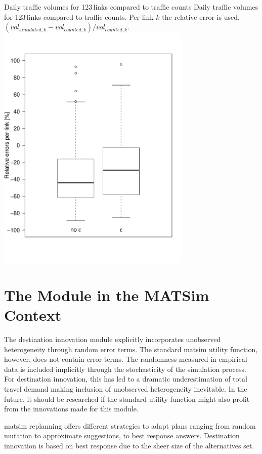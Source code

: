 \createfigure%
{Daily traffic volumes for 123\,links compared to traffic counts}%
{Daily traffic volumes for 123\,links compared to traffic counts. Per link $k$ the relative error is used, \ie $(vol_{simulated,k}-vol_{counted,k}) / vol_{counted,k}$.}%
{\label{fig:countsLEGO}}%
{\includegraphics[width=0.7\textwidth, angle=0]{extending/figures/dc/zhCounts.pdf}}%
{}

\section{The Module in the MATSim Context}
The destination innovation module explicitly incorporates unobserved heterogeneity through random error terms. 
The standard \gls{matsim} utility function, however, does not contain error terms. 
The randomness measured in empirical data is included implicitly through the stochasticity of the simulation process. 
For destination innovation, this has led to a dramatic underestimation of total travel demand making inclusion of unobserved heterogeneity inevitable. 
In the future, it should be researched if the standard utility function might also profit from the innovations made for this module.

\gls{matsim} replanning offers different strategies to adapt plans ranging from random mutation to approximate suggestions, to best response answers. 
Destination innovation is based on best response due to the sheer size of the alternatives set. 

